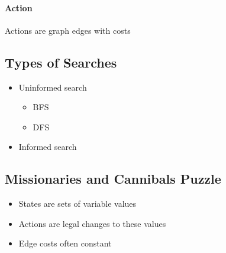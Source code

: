       \paragraph{Action}
      Actions are graph edges with costs

  \subsection{Types of Searches}

    \begin{itemize}
      \item Uninformed search
      \begin{itemize}
        \item BFS
        \item DFS
      \end{itemize}

      \item Informed search
    \end{itemize}

  \subsection{Missionaries and Cannibals Puzzle}

    \begin{itemize}
      \item States are sets of variable values
      \item Actions are legal changes to these values
      \item Edge costs often constant
    \end{itemize}




